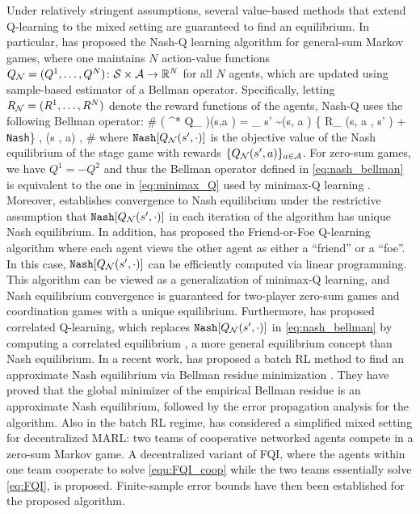 Under relatively stringent assumptions, 
several value-based methods that extend 
Q-learning \cite{watkins1992q} 
 to the mixed setting are guaranteed to find an equilibrium.  
In particular, \cite{hu2003nash}  has proposed the Nash-Q learning  algorithm for general-sum Markov games, where  one maintains $N$  action-value functions $ Q_{\mathcal{N}} = (Q^1, \ldots, Q^N) \colon    {\mathcal{S}} \times \mathcal{A} \rightarrow \mathbb{R}^N  $  for all $N$ agents,  which are  updated 
 using sample-based estimator of a Bellman operator. Specifically,  letting $ R_{\mathcal{N}} = ( R^1, \ldots, R^N)$ denote the reward functions of the agents,  Nash-Q uses the following Bellman operator: 
 \# \label{eq:nash_bellman}
   ( \cT^* Q_{\cN} )(s,a )  = \EE _{  s' \sim \cP(\cdot \given s, a )} \big  \{ R_{\cN}  (s, a , s' ) + \gamma \cdot \texttt{Nash} \bigr \} , \quad \forall (s , a) \in \cS\times \cA,
   \#
where   $\texttt{Nash}[  Q_{\mathcal{N}} (s', \cdot )   ]$  is the objective value of the Nash equilibrium of the stage game with rewards $\{ Q_{\mathcal{N}} (s', a ) \}_{a \in \mathcal{A}}   $. For zero-sum games, we have $Q^1 = -Q^2$ and thus the Bellman operator defined in \eqref{eq:nash_bellman} is equivalent to the one in  \eqref{eq:minimax_Q} used by minimax-Q learning \cite{littman1994markov}.  Moreover, \cite{hu2003nash} establishes  convergence to Nash equilibrium under the    restrictive assumption that  $\texttt{Nash}[  Q_{\mathcal{N}} (s', \cdot )   ]$ in each iteration of the algorithm has unique Nash equilibrium.  
In addition, \cite{littman2001friend} has proposed the 
   Friend-or-Foe Q-learning   algorithm where each agent views the  other agent as either a ``friend'' or a ``foe''. In this case, $\texttt{Nash}[  Q_{\mathcal{N}} (s', \cdot )   ]$ can be efficiently computed via linear programming.  This algorithm can be viewed as a  generalization of minimax-Q learning, and Nash equilibrium convergence is guaranteed for two-player zero-sum games and coordination games with a unique equilibrium. Furthermore,  
 \cite{greenwald2003correlated} has proposed  correlated Q-learning, which replaces $\texttt{Nash}[  Q_{\mathcal{N}} (s', \cdot )   ]$ in \eqref{eq:nash_bellman} by computing a correlated equilibrium \cite{aumann1974subjectivity}, a more general equilibrium concept than Nash equilibrium. In a recent work, \cite{pmlr-v54-perolat17a}  has proposed a batch RL method to find an approximate  Nash equilibrium  via    Bellman residue minimization \cite{maillard2010finite}. They have proved that the global minimizer of the empirical Bellman residue is an approximate  Nash equilibrium, followed by the error propagation analysis for the algorithm.  
Also in the batch RL regime, \cite{zhang2018finite} has considered a simplified mixed setting for decentralized MARL: two teams of cooperative networked agents compete in a zero-sum Markov game. 
A decentralized  variant of FQI, where the agents within one team cooperate to solve \eqref{equ:FQI_coop} while the two teams essentially solve \eqref{eq:FQI}, is proposed. 
Finite-sample error bounds have  then been established for the proposed algorithm. 

